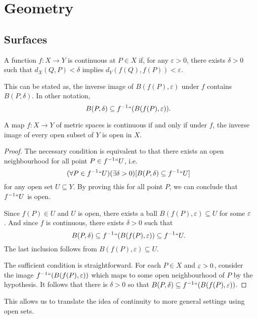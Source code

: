 \documentclass[main.tex]{subfiles}
\begin{document}
	\chapter{Geometry}
		\section{Surfaces}
		\begin{definition}
			A function $f\colon X \to Y$ is continuous at $P\in X$ if, for any $\varepsilon >0$, there exists $\delta > 0$ such that $d_X(Q, P) < \delta$ implies $d_Y(f(Q), f(P)) < \varepsilon$.
			
			This can be stated as, the inverse image of $B(f(P), \varepsilon)$ under $f$ contains $B(P, \delta)$. In other notation,
			\begin{equation*}
					B(P,\delta) \subseteq f^{-1} ``(B(f(P), \varepsilon)).
			\end{equation*}
		\end{definition}
		\begin{lemma}
			A map $f\colon X \to Y$ of metric spaces is continuous if and only if under $f$, the inverse image  of every open subset of $Y$ is open in $X$.
		\end{lemma}
		\begin{proof}
			The necessary condition is equivalent to that there exists an open neighbourhood for all point $P \in f^{-1} ``U$, i.e.
			\begin{equation*}
			(\forall P \in f^{-1} ``U)(\exists \delta > 0)[B(P, \delta) \subseteq f^{-1} ``U]
			\end{equation*}
			for any open set $U \subseteq Y$. By proving this for all point $P$, we can conclude that $f^{-1} `` U$ is open. 
			
			Since $f(P) \in U$ and $U$ is open, there exists a ball $B(f(P), \varepsilon) \subseteq U$ for some $\varepsilon$. And since $f$ is continuous, there exists $\delta > 0$ such that
			\begin{equation*}
				B(P, \delta) \subseteq f^{-1} ``(B(f(P), \varepsilon)) \subseteq f^{-1}``U.
			\end{equation*} 
			The last inclusion follows from $B(f(P), \varepsilon) \subseteq U$.
			
			The sufficient condition is straightforward. For each $P \in X$ and $\varepsilon > 0$, consider the image $f^{-1} ``(B(f(P), \varepsilon))$ which maps to some open neighbourhood of $P$ by the hypothesis. It follows that there is $\delta >0$ so that $B(P,\delta) \subseteq f^{-1} ``(B(f(P), \varepsilon))$.
		\end{proof}
		This allows us to translate the idea of continuity to more general settings using open sets.
\end{document}
